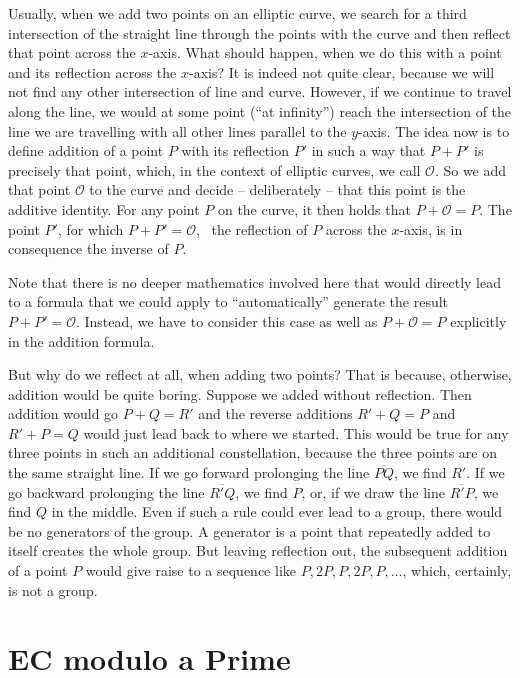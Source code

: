 \documentclass[tikz]{scrreprt}
\begin{document}
Usually, when we add two points on an elliptic curve,
we search for a third intersection of the straight line 
through the points with the curve 
and then reflect that point across
the $x$-axis. What should happen,
when we do this with a point and its reflection
across the $x$-axis? It is indeed not quite clear,
because we will not find any other intersection of line
and curve. However, if we continue to travel
along the line, we would at some point (``at infinity'')
reach the intersection of the line we are travelling
with all other lines parallel to the $y$-axis.
The idea now is to define addition of a point $P$
with its reflection $P'$ in such a way that
$P + P'$ is precisely that point, which,
in the context of elliptic curves, we call $\mathcal{O}$.
So we add that point $\mathcal{O}$ to the curve
and decide -- deliberately -- that this point is
the additive identity. For any point $P$ on the curve,
it then holds that $P + \mathcal{O} = P$.
The point $P'$, for which $P + P' = \mathcal{O}$,
\ie\ the reflection of $P$ across the $x$-axis,
is in consequence the inverse of $P$.

Note that there is no deeper mathematics involved here
that would directly lead to a formula that we could apply
to ``automatically'' generate the result
$P + P' = \mathcal{O}$. Instead, we have
to consider this case as well as $P + \mathcal{O} = P$
explicitly in the addition formula.

But why do we reflect at all, when adding two points?
That is because, otherwise, addition would
be quite boring. Suppose we added without reflection.
Then addition would go $P + Q = R'$ and the 
reverse additions $R' + Q = P$ and
$R' + P = Q$ would just lead back to where we started.
This would be true for any three points 
in such an additional constellation, because the three points
are on the same straight line. If we go forward prolonging
the line $\overline{PQ}$, we find $R'$. If we go backward
prolonging the line $\overline{R'Q}$, we find $P$, or,
if we draw the line $\overline{R'P}$, we find $Q$ in the middle.
Even if such a rule
could ever lead to a group, there would be no 
generators of the group. A generator is a point
that repeatedly added to itself creates the whole group.
But leaving reflection out, the subsequent addition of
a point $P$ would give raise to a sequence like
$P,2P,P,2P,P,\dots$, which, certainly, is not a group.
\section{EC modulo a Prime} 
\end{document}
